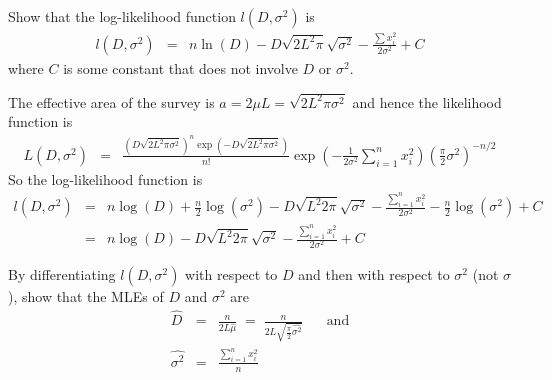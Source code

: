 \begin{questions}
\begin{parts}
\begin{subparts}

\item Show that the log-likelihood function $l(D,\sigma^2)$ is
\begin{eqnarray*}
l(D,\sigma^2)&=&n\ln(D)-D\sqrt{2L^2\pi}\sqrt{\sigma^2}
-\frac{\sum{x_i^2}}{2\sigma^2}+C
\end{eqnarray*}
\noindent
where $C$ is some constant that does not involve $D$ or $\sigma^2$.

{\begin{solution}
The effective area of the survey is $a=2\mu L=\sqrt{2L^2\pi\sigma^2}$ and hence the likelihood function is
\begin{eqnarray*}
L(D,\sigma^2)
&=&\frac{\left(D\sqrt{2L^2\pi\sigma^2}\right)^n\exp\left(-D\sqrt{2L^2\pi\sigma^2}\right)}{n!}
\exp\left(-\frac{1}{2\sigma^2}\sum_{i=1}^nx_i^2\right)\left(\frac{\pi}{2}\sigma^2\right)^{-n/2}
\end{eqnarray*}
\noindent
So the log-likelihood function is
\begin{eqnarray*}
l(D,\sigma^2)
&=&n\log(D)+\frac{n}{2}\log(\sigma^2)-D\sqrt{L^2 2\pi}\sqrt{\sigma^2}-\frac{\sum_{i=1}^n x_i^2}{2\sigma^2}-\frac{n}{2}\log(\sigma^2)+C \\
&=&n\log(D)-D\sqrt{L^2 2\pi}\sqrt{\sigma^2}-\frac{\sum_{i=1}^n x_i^2}{2\sigma^2}+C
\end{eqnarray*}
\end{solution}}

\item By differentiating $l(D,\sigma^2)$ with respect to $D$ and then with respect to $\sigma^2$ (not $\sigma$), show that the MLEs of $D$ and $\sigma^2$ are
\begin{eqnarray*}
\hat{D}&=&\frac{n}{2L\hat{\mu}}\;=\;\frac{n}{2L\sqrt{\frac{\pi}{2}\widehat{\sigma^2}}}\;\;\;\;\;\;\mbox{and} \\
\widehat{\sigma^2}&=&\frac{\sum_{i=1}^n x_i^2}{n}
\end{eqnarray*}


\end{subparts}
\end{parts}
\end{questions}
